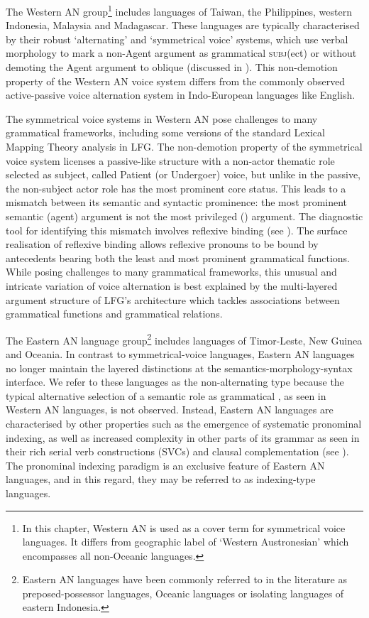 \documentclass[output=paper,chinesefont]{../langscibook}
\begin{document}
The Western AN group\footnote{In this chapter, Western AN is used as a cover term for symmetrical voice languages. It differs from  geographic label of `Western Austronesian' which encompasses all non-Oceanic languages.} includes languages of Taiwan, the Philippines, western Indonesia, Malaysia and Madagascar. These languages are typically characterised by their robust `alternating' and `symmetrical voice' systems, which use verbal morphology to mark a non-Agent argument as grammatical \textsc{subj}(ect) or \PIVOT without demoting the Agent argument to oblique (discussed in ). This non-demotion property of the Western AN voice system differs from the commonly observed active-passive voice alternation system in Indo-European languages like English.

The symmetrical voice systems in Western AN pose challenges to many grammatical frameworks, including some versions of the standard Lexical Mapping Theory analysis in LFG. The non-demotion property of the symmetrical voice system licenses a passive-like structure with a non-actor thematic role selected as subject, called Patient (or Undergoer) voice, but unlike in the passive, the non-subject actor role has the most prominent core status. This leads to a mismatch between its semantic and syntactic prominence: the most prominent semantic (agent) argument is not the most privileged (\SUBJ) argument. The diagnostic tool for identifying this mismatch involves reflexive binding (see ). The surface realisation of reflexive binding allows reflexive pronouns to be bound by antecedents bearing both the least and most prominent grammatical functions. While posing challenges to many grammatical frameworks, this unusual and intricate variation of voice alternation is best explained by the multi-layered argument structure of LFG's architecture which tackles associations between grammatical functions and grammatical relations.

The Eastern AN language group\footnote{Eastern AN languages have been commonly referred to in the literature as preposed-possessor languages, Oceanic languages or isolating languages of eastern Indonesia.} includes languages of Timor-Leste, New Guinea and Oceania. In contrast to symmetrical-voice languages, Eastern AN languages no longer maintain the layered distinctions at the semantics-morphology-syntax interface. We refer to these languages as the non-alternating type because the typical alternative selection of a semantic role as grammatical \SUBJ, as seen in Western AN languages, is not observed. Instead, Eastern AN languages are characterised by other properties such as the emergence of systematic pronominal indexing, as well as increased complexity in other parts of its grammar as seen in their rich serial verb constructions (SVCs) and clausal complementation (see ). The pronominal indexing paradigm is an exclusive feature of Eastern AN languages, and in this regard, they may be referred to as indexing-type languages.
\end{document}

